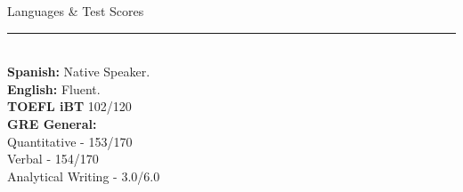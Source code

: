 \documentclass[letterpaper,10pt]{article}
\begin{document}
\begin{minipage}{0.4\textwidth}
\large{Languages \& Test Scores} \\
\textcolor{Dandelion}{\rule{0.7\textwidth}{0.05in}} \\
\textbf{Spanish:} Native Speaker. \\
\textbf{English:} \hspace*{0.1cm} Fluent. \\
\textbf{TOEFL iBT} 102/120 \\
\textbf{GRE General:}  \\
\hspace*{0.5cm}Quantitative - 153/170 \\
\hspace*{0.5cm}Verbal - 154/170 \\
\hspace*{0.5cm}Analytical Writing - 3.0/6.0\\
\end{minipage} 
\end{document}
